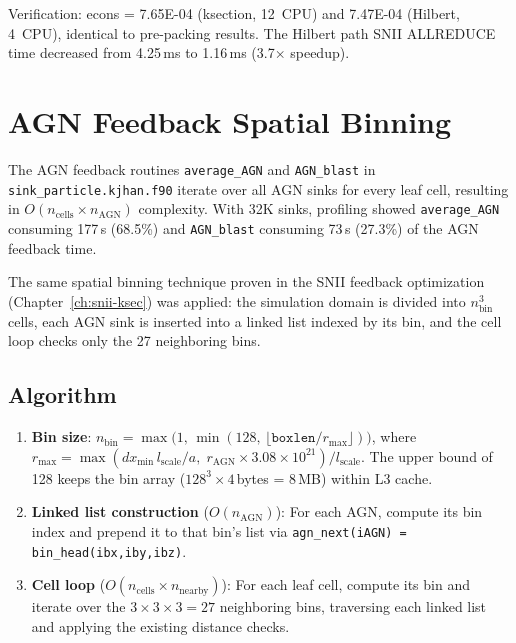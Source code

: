 \documentclass[11pt,fleqn]{book}
\begin{document}
Verification: econs = 7.65E-04 (ksection, 12~CPU) and 7.47E-04 (Hilbert, 4~CPU), identical to pre-packing results. The Hilbert path SNII ALLREDUCE time decreased from 4.25\,ms to 1.16\,ms (3.7$\times$ speedup).


\chapter{AGN Feedback Spatial Binning}
\label{ch:agn-binning}

The AGN feedback routines \texttt{average\_AGN} and \texttt{AGN\_blast} in \texttt{sink\_particle.kjhan.f90} iterate over all AGN sinks for every leaf cell, resulting in $O(n_\mathrm{cells} \times n_\mathrm{AGN})$ complexity. With 32K sinks, profiling showed \texttt{average\_AGN} consuming 177\,s (68.5\%) and \texttt{AGN\_blast} consuming 73\,s (27.3\%) of the AGN feedback time.

The same spatial binning technique proven in the SNII feedback optimization (Chapter~\ref{ch:snii-ksec}) was applied: the simulation domain is divided into $n_\mathrm{bin}^3$ cells, each AGN sink is inserted into a linked list indexed by its bin, and the cell loop checks only the 27 neighboring bins.

\section{Algorithm}

\begin{enumerate}[leftmargin=2em]
  \item \textbf{Bin size}: $n_\mathrm{bin} = \max\bigl(1,\,\min(128,\,\lfloor\texttt{boxlen}/r_\mathrm{max}\rfloor)\bigr)$, where $r_\mathrm{max} = \max(dx_\mathrm{min}\,l_\mathrm{scale}/a,\; r_\mathrm{AGN}\times 3.08\times10^{21})/l_\mathrm{scale}$. The upper bound of 128 keeps the bin array ($128^3 \times 4$\,bytes = 8\,MB) within L3 cache.
  \item \textbf{Linked list construction} ($O(n_\mathrm{AGN})$): For each AGN, compute its bin index and prepend it to that bin's list via \texttt{agn\_next(iAGN) = bin\_head(ibx,iby,ibz)}.
  \item \textbf{Cell loop} ($O(n_\mathrm{cells} \times n_\mathrm{nearby})$): For each leaf cell, compute its bin and iterate over the $3\times3\times3=27$ neighboring bins, traversing each linked list and applying the existing distance checks.
\end{enumerate}
\end{document}
